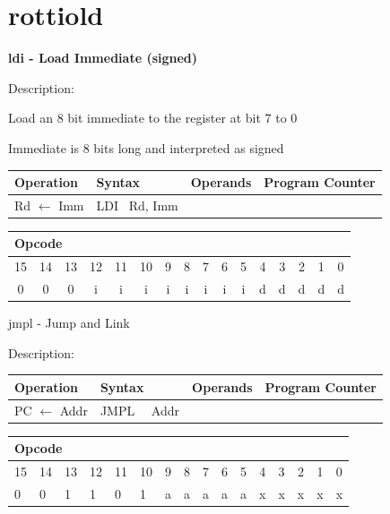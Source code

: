 \documentclass[%
	pdftex,
	a4paper,
	oneside,
	bibtotoc,%
	idxtotoc,%
	bibtotocnumbered,
	halfparskip,%
]{scrbook}
\begin{document}
\chapter{rottiold}
\textbf{ldi - Load Immediate (signed)}

Description:

Load an 8 bit immediate to the register at bit 7 to 0

Immediate is 8 bits long and interpreted as signed

\begin{tabular}{|l|l|l|l|}
\hline
Operation & Syntax & Operands & Program Counter \\ \hline
Rd $\leftarrow $ Imm & LDI \ Rd, Imm &  &  \\ \hline
\end{tabular}

\begin{tabular}{|c|c|c|c|c|c|c|c|c|c|c|c|c|c|c|c|}
\hline
\multicolumn{6}{|l|}{Opcode} & \multicolumn{5}{|l|}{} & \multicolumn{5}{|l|}{
} \\ \hline
15 & 14 & 13 & 12 & 11 & 10 & 9 & 8 & 7 & 6 & 5 & 4 & 3 & 2 & 1 & 0 \\ \hline
0 & 0 & 0 & i & i & i & i & i & i & i & i & d & d & d & d & d \\ \hline
\end{tabular}

\bigskip

jmpl - Jump and Link

Description:

\begin{tabular}{|l|l|l|l|}
\hline
Operation & Syntax & Operands & Program Counter \\ \hline
PC $\longleftarrow $ Addr & JMPL \ \ Addr &  &  \\ \hline
\end{tabular}

\begin{tabular}{|c|c|c|c|c|c|c|c|c|c|c|c|c|c|c|c|}
\hline
\multicolumn{6}{|l|}{Opcode} & \multicolumn{5}{|l|}{} & \multicolumn{5}{|l|}{
} \\ \hline
15 & 14 & 13 & 12 & 11 & 10 & 9 & 8 & 7 & 6 & 5 & 4 & 3 & 2 & 1 & 0 \\ \hline
\multicolumn{1}{|l|}{0} & \multicolumn{1}{|l|}{0} & \multicolumn{1}{|l|}{1}
& \multicolumn{1}{|l|}{1} & \multicolumn{1}{|l|}{0} & \multicolumn{1}{|l|}{1}
& \multicolumn{1}{|l|}{a} & \multicolumn{1}{|l|}{a} & \multicolumn{1}{|l|}{a}
& \multicolumn{1}{|l|}{a} & \multicolumn{1}{|l|}{a} & \multicolumn{1}{|l|}{x}
& \multicolumn{1}{|l|}{x} & \multicolumn{1}{|l|}{x} & \multicolumn{1}{|l|}{x}
& \multicolumn{1}{|l|}{x} \\ \hline
\end{tabular}
\end{document}
